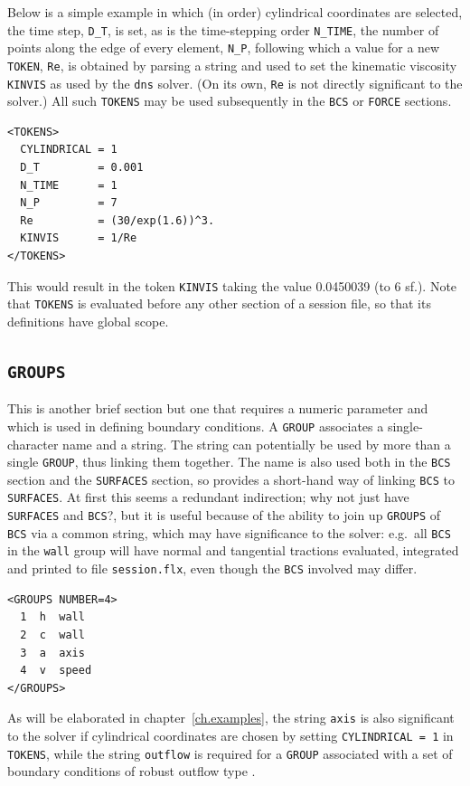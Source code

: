 \documentclass[11pt]{report}
\newcommand{\eg}{e.g.\ } \newcommand{\CC}{\mathrm{c.c.}}
\begin{document}
Below is a simple example in which (in order) cylindrical coordinates
are selected, the time step, \verb|D_T|, is set, as is the
time-stepping order \verb|N_TIME|, the number of points along the edge
of every element, \verb|N_P|, following which a value for a new
\verb|TOKEN|, \verb|Re|, is obtained by parsing a string and used to
set the kinematic viscosity \verb|KINVIS| as used by the \verb|dns|
solver.  (On its own, \verb|Re| is not directly significant to the
solver.) All such \verb|TOKENS| may be used subsequently in the
\verb|BCS| or \verb|FORCE| sections.
%
{\small
\begin{verbatim}
<TOKENS>
  CYLINDRICAL = 1
  D_T         = 0.001
  N_TIME      = 1
  N_P         = 7
  Re          = (30/exp(1.6))^3.
  KINVIS      = 1/Re
</TOKENS>
\end{verbatim}
}
%
This would result in the token \verb|KINVIS| taking the value
0.0450039 (to 6 sf.). Note that \verb|TOKENS| is evaluated before any
other section of a session file, so that its definitions have global
scope.

\subsection{\texttt{GROUPS}}
\label{sec.groups}

This is another brief section but one that requires a numeric
parameter and which is used in defining boundary conditions. A
\verb|GROUP| associates a single-character name and a string.  The
string can potentially be used by more than a single \verb|GROUP|,
thus linking them together.  The name is also used both in the
\verb|BCS| section and the \verb|SURFACES| section, so provides a
short-hand way of linking \verb|BCS| to \verb|SURFACES|.  At first
this seems a redundant indirection; why not just have \verb|SURFACES|
and \verb|BCS|?, but it is useful because of the ability to join up
\verb|GROUPS| of \verb|BCS| via a common string, which may have
significance to the solver: \eg all \verb|BCS| in the \verb|wall|
group will have normal and tangential tractions evaluated, integrated
and printed to file \verb|session.flx|, even though the \verb|BCS|
involved may differ.
%
{\small
\begin{verbatim}
<GROUPS NUMBER=4>
  1  h  wall
  2  c  wall
  3  a  axis
  4  v  speed
</GROUPS>
\end{verbatim}
}
%
As will be elaborated in chapter~\ref{ch.examples}, the string
\verb|axis| is also significant to the solver if cylindrical
coordinates are chosen by setting \verb|CYLINDRICAL = 1| in
\verb|TOKENS|, while the string \verb|outflow| is required for a
\verb|GROUP| associated with a set of boundary conditions of robust
outflow type \citep{dkc14}.
\end{document}
